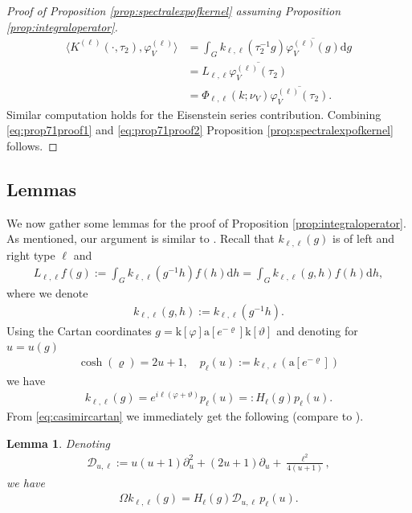 \documentclass[12pt]{amsart}
\newtheorem{lemma}[theorem]{Lemma}
\theoremstyle{definition}
\theoremstyle{remark}
\numberwithin{equation}{section}
\newcommand{\1}{{\mathbf 1}}
\renewcommand{\d}{\mathrm d}
\begin{document}
\begin{proof}[Proof of Proposition \ref{prop:spectralexpofkernel} assuming Proposition \ref{prop:integraloperator}]
\begin{align} \nonumber
   \langle    K^{(\ell)}(\cdot,\tau_2), \varphi_V^{(\ell)} \rangle &=  \int_{ G}  k_{\ell,\ell}(\tau_2^{-1}g) \overline{\varphi_V^{(\ell)}(g)} \d g \\
  \nonumber &=L_{\ell,\ell} \overline{\varphi_V^{(\ell)} (\tau_2)}\\
\label{eq:prop71proof2}   &= \Phi_{\ell,\ell}(k;\nu_V) \overline{ \varphi_{V}^{(\ell)}(\tau_2)}.
\end{align}
Similar computation holds for the Eisenstein series contribution. Combining \eqref{eq:prop71proof1} and \eqref{eq:prop71proof2} Proposition \ref{prop:spectralexpofkernel} follows.
\end{proof}




\subsection{Lemmas}
We now gather some lemmas for the proof of Proposition \ref{prop:integraloperator}. As mentioned, our argument is similar to \cite[Section 1.8]{IwaniecBook}.
Recall that $k_{\ell,\ell}(g)$  is of left and right type $\ell$  and
\begin{align*}
    L_{\ell,\ell} f (g) := \int_{G} k_{\ell,\ell}(g^{-1} h) f(h) \d h = \int_{G} k_{\ell,\ell}(g,h) f(h) \d h,
\end{align*}
where we denote
\begin{align*}
 k_{\ell,\ell}(g,h) := k_{\ell,\ell}(g^{-1} h). 
\end{align*}
Using the Cartan coordinates $g= \mathrm{k}[\varphi] \mathrm{a}[e^{-\varrho}]\mathrm{k}[\vartheta]$ and denoting for $u=u(g)$
\begin{align*}
  \cosh(\varrho) =  2u+1, \quad p_\ell (u) := k_{\ell,\ell}(\mathrm{a}[e^{-\varrho}])
\end{align*}
we have
\begin{align}\label{eq:KHpl}
    k_{\ell,\ell}(g) = e^{i\ell(\varphi + \vartheta)} p_\ell(u) =: H_{\ell}(g) p_\ell(u).
\end{align}
From \eqref{eq:casimircartan} we immediately get the following (compare to \cite[eq. (33.7)]{motohashielements}).
\begin{lemma}\label{le:omegaforfixedtypes}
Denoting
\begin{align*}
  \mathcal{D}_{u,\ell}:= u(u+1)\partial_{u}^2+(2u+1)\partial_{u}+\frac{\ell^2}{4(u+1)},
\end{align*}
we have
\begin{align*}
    \Omega     k_{\ell,\ell}(g)=H_{\ell}(g)   \mathcal{D}_{u,\ell}\, p_\ell (u).
\end{align*}
\end{lemma}
\end{document}
